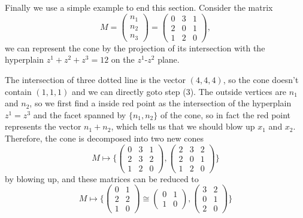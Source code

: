 \documentclass[12pt]{article}
\theoremstyle{definition}
\theoremstyle{plain}
\begin{document}
Finally we use a simple example to end this section. Consider the matrix
\[
	M=\left(
		\begin{array}{ccc}
			n_1 \\
			n_2 \\
			n_3
		\end{array}
	\right)
	=\left(
		\begin{array}{ccc}
			0 & 3 & 1 \\
			2 & 0 & 1 \\
			1 & 2 & 0
		\end{array}
	\right),
\]
we can represent the cone by the projection of its intersection with 
the hyperplain $z^1+z^2+z^3=12$ on the $z^1$-$z^2$ plane.
\begin{center}
\end{center}
The intersection of three dotted line is the vector $(4,4,4)$, 
so the cone doesn't contain $(1,1,1)$ and we can directly goto step (3).
The outside vertices are $n_1$ and $n_2$, so we first find a inside red point 
as the intersection of the hyperplain 
$z^1=z^3$ and the facet spanned by $\{n_1,n_2\}$ of the cone, 
so in fact the red point represents the vector $n_1+n_2$, 
which tells us that we should blow up $x_1$ and $x_2$.
Therefore, the cone is decomposed into two new cones 
\[
	M\mapsto \biggl\{
		\begin{pmatrix}
			0&3&1\\
			2&3&2\\
			1&2&0
		\end{pmatrix},
		\begin{pmatrix}
			2&3&2\\
			2&0&1\\
			1&2&0
		\end{pmatrix}
	\biggr\}
\] 
by blowing up, and these matrices can be reduced to
\[
	M\mapsto \biggl\{
		\begin{pmatrix}
			0&1\\
			2&2\\
			1&0
		\end{pmatrix}\cong
		\begin{pmatrix}
			0&1\\
			1&0
		\end{pmatrix},
		\begin{pmatrix}
			3&2\\
			0&1\\
			2&0
		\end{pmatrix}
	\biggr\}
\]
\end{document}
